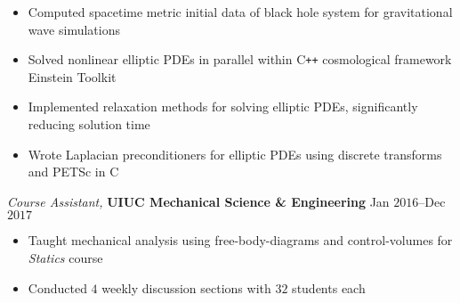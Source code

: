 \documentclass[10pt]{article}
\begin{document}
\begin{multicols}{2}
\vspace{-1.75em}
\begin{itemize}[label=-]
    \setlength\itemsep{-0.25em}
    \setlength{\itemindent}{-1.50em}
    \item Computed spacetime metric initial data of black hole system for gravitational wave simulations
    \item Solved nonlinear elliptic PDEs in parallel within C\texttt{++} cosmological framework {Einstein Toolkit}
    \item Implemented relaxation methods for solving elliptic PDEs, significantly reducing solution time
    \item Wrote Laplacian preconditioners for elliptic PDEs using discrete transforms and PETSc in C
\end{itemize}
\vspace{-2.0em}

\vspace{0.5em}
%
{\sl Course Assistant,} \textbf{UIUC Mechanical Science \& Engineering} \hfill Jan $2016$--Dec $2017$

\vspace{-1.75em}
\begin{itemize}[label=-]
    \setlength\itemsep{-0.25em}
    \setlength{\itemindent}{-1.50em}
    \item Taught mechanical analysis using free-body-diagrams and control-volumes for \textit{Statics} course
    \item Conducted $4$ weekly discussion sections with $32$ students each
\end{itemize}
\vspace{-2.0em}

\end{multicols}
\vspace{-1.5em}
\end{document}
